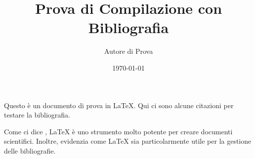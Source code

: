 \documentclass{article}
\title{Prova di Compilazione con Bibliografia}
\author{Autore di Prova}
\date{\today}
\begin{document}
\maketitle

Questo è un documento di prova in LaTeX. Qui ci sono alcune citazioni per testare la bibliografia.

Come ci dice \cite{esempio1}, LaTeX è uno strumento molto potente per creare documenti scientifici. Inoltre, \cite{esempio2} evidenzia come LaTeX sia particolarmente utile per la gestione delle bibliografie.

\printbibliography  %
\end{document}
